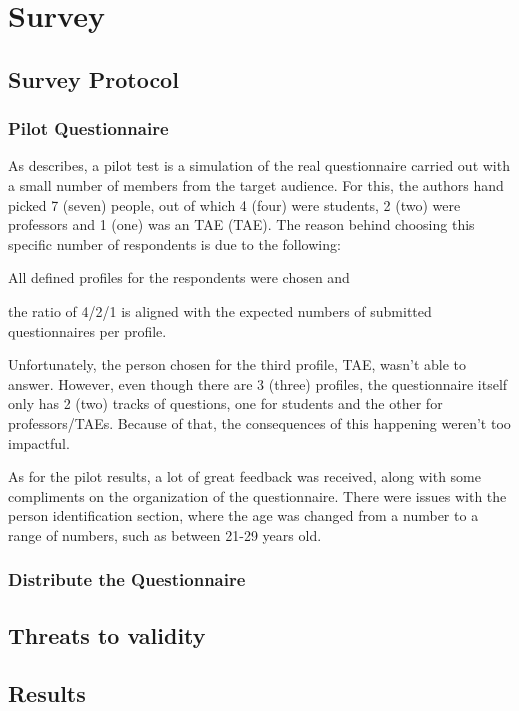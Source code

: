 
\chapter{Survey}\label{survey}

\section{Survey Protocol}\label{sec:survey-protocol}

\subsection{Pilot Questionnaire}\label{sec:sv-p:pilot}

As  describes, a pilot test is a simulation of the real questionnaire carried out with a small number of members from the target audience. For this, the authors hand picked 7 (seven) people, out of which 4 (four) were students, 2 (two) were professors and 1 (one) was an \acl{TAE} (\ac{TAE}). The reason behind choosing this specific number of respondents is due to the following:
\begin{inparaenum}[(i)]
  \item All defined profiles for the respondents were chosen and
  \item the ratio of 4/2/1 is aligned with the expected numbers of submitted questionnaires per profile.
\end{inparaenum}

Unfortunately, the person chosen for the third profile, \ac{TAE}, wasn't able to answer. However, even though there are 3 (three) profiles, the questionnaire itself only has 2 (two) tracks of questions, one for students and the other for professors/\acp{TAE}. Because of that, the consequences of this happening weren't too impactful.

As for the pilot results, a lot of great feedback was received, along with some compliments on the organization of the questionnaire. There were issues with the person identification section, where the age was changed from a number to a range of numbers, such as between 21-29 years old.

\subsection{Distribute the Questionnaire}\label{sec:survey-distribute}

\section{Threats to validity}\label{sec:sv-validity}


\section{Results}\label{sec:sv-results}